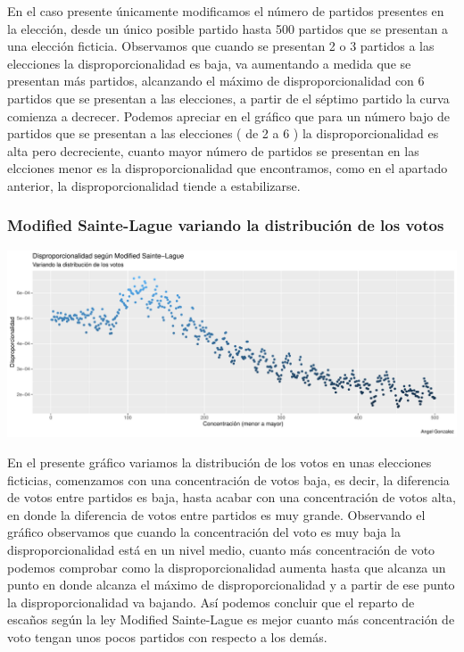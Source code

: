 \documentclass[12pt,a4paper,]{book}
\numberwithin{dummy}{section}
\theoremstyle{ocrenumbox}
\theoremstyle{blacknumex}
\theoremstyle{blacknumbox}
\theoremstyle{ocrenum}
\theoremstyle{ocrenum}
\begin{document}
En el caso presente únicamente modificamos el número de partidos
presentes en la elección, desde un único posible partido hasta 500
partidos que se presentan a una elección ficticia. Observamos que cuando
se presentan 2 o 3 partidos a las elecciones la disproporcionalidad es
baja, va aumentando a medida que se presentan más partidos, alcanzando
el máximo de disproporcionalidad con 6 partidos que se presentan a las
elecciones, a partir de el séptimo partido la curva comienza a decrecer.
Podemos apreciar en el gráfico que para un número bajo de partidos que
se presentan a las elecciones ( de 2 a 6 ) la disproporcionalidad es
alta pero decreciente, cuanto mayor número de partidos se presentan en
las elcciones menor es la disproporcionalidad que encontramos, como en
el apartado anterior, la disproporcionalidad tiende a estabilizarse.

\hypertarget{modified-sainte-lague-variando-la-distribuciuxf3n-de-los-votos}{%
\subsubsection{Modified Sainte-Lague variando la distribución de los
votos}\label{modified-sainte-lague-variando-la-distribuciuxf3n-de-los-votos}}

\begin{center}\includegraphics[width=0.95\linewidth]{figurasR/unnamed-chunk-21-1} \end{center}

En el presente gráfico variamos la distribución de los votos en unas
elecciones ficticias, comenzamos con una concentración de votos baja, es
decir, la diferencia de votos entre partidos es baja, hasta acabar con
una concentración de votos alta, en donde la diferencia de votos entre
partidos es muy grande. Observando el gráfico observamos que cuando la
concentración del voto es muy baja la disproporcionalidad está en un
nivel medio, cuanto más concentración de voto podemos comprobar como la
disproporcionalidad aumenta hasta que alcanza un punto en donde alcanza
el máximo de disproporcionalidad y a partir de ese punto la
disproporcionalidad va bajando. Así podemos concluir que el reparto de
escaños según la ley Modified Sainte-Lague es mejor cuanto más
concentración de voto tengan unos pocos partidos con respecto a los
demás.
\end{document}
